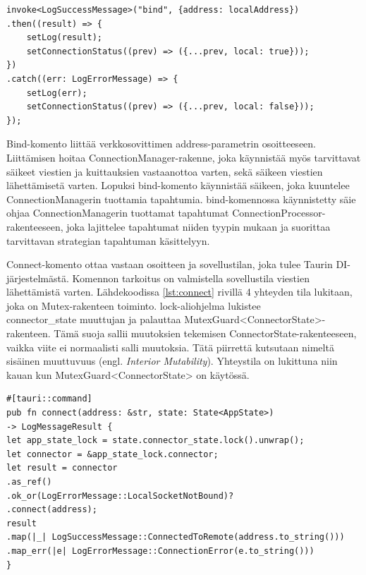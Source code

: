 \documentclass[a4paper,12pt]{article}
\begin{document}
    \begin{lstlisting}[caption={bind-komennon kutsuminen.}, label={lst:calling_bind}]
invoke<LogSuccessMessage>("bind", {address: localAddress})
.then((result) => {
    setLog(result);
    setConnectionStatus((prev) => ({...prev, local: true}));
})
.catch((err: LogErrorMessage) => {
    setLog(err);
    setConnectionStatus((prev) => ({...prev, local: false}));
});\end{lstlisting}

    Bind-komento liittää verkkosovittimen address-parametrin osoitteeseen. Liittämisen hoitaa ConnectionManager-rakenne, joka käynnistää myös tarvittavat säikeet viestien ja kuittauksien vastaanottoa varten, sekä säikeen viestien lähettämisetä varten. Lopuksi bind-komento käynnistää säikeen, joka kuuntelee\\ ConnectionManagerin tuottamia tapahtumia.
    bind-komennossa käynnistetty säie ohjaa ConnectionManagerin tuottamat tapahtumat ConnectionProcessor-rakenteeseen, joka lajittelee tapahtumat niiden tyypin mukaan ja suorittaa tarvittavan strategian tapahtuman käsittelyyn.\par

    Connect-komento ottaa vastaan osoitteen ja sovellustilan, joka tulee Taurin DI-järjestelmästä. Komennon tarkoitus on valmistella sovellustila viestien lähettämistä varten. Lähdekoodissa \ref{lst:connect} rivillä 4 yhteyden tila lukitaan, joka on Mutex-rakenteen toiminto. lock-aliohjelma lukistee \\ connector\_state muuttujan ja palauttaa MutexGuard<ConnectorState>-rakenteen. Tämä suoja sallii muutoksien tekemisen ConnectorState-rakenteeseen, vaikka viite ei normaalisti salli muutoksia. Tätä piirrettä kutsutaan nimeltä sisäinen muuttuvuus (engl.  \textit{Interior Mutability}). Yhteystila on lukittuna niin kauan kun MutexGuard<ConnectorState> on käytössä.\par

    \begin{lstlisting}[basicstyle=\small\ttfamily,caption={connect-komento.}, label={lst:connect}]
#[tauri::command]
pub fn connect(address: &str, state: State<AppState>)
-> LogMessageResult {
let app_state_lock = state.connector_state.lock().unwrap();
let connector = &app_state_lock.connector;
let result = connector
.as_ref()
.ok_or(LogErrorMessage::LocalSocketNotBound)?
.connect(address);
result
.map(|_| LogSuccessMessage::ConnectedToRemote(address.to_string()))
.map_err(|e| LogErrorMessage::ConnectionError(e.to_string()))
}\end{lstlisting}
\end{document}
